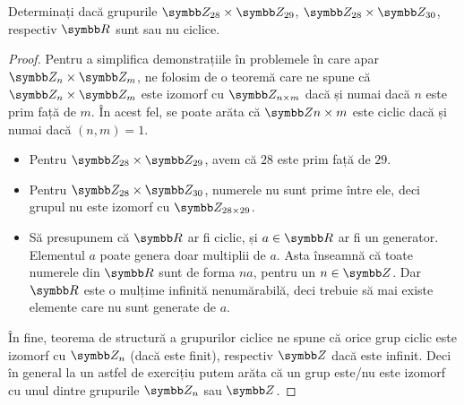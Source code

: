 \begin{exercise}
Determinați dacă grupurile \(\integersmod{28} \times \integersmod{29}\), \(\integersmod{28} \times \integersmod{30}\), respectiv \(\reals\) sunt sau nu ciclice.
\end{exercise}
\begin{proof}
Pentru a simplifica demonstrațiile în problemele în care apar \(\integersmod{n} \times \integersmod{m}\), ne folosim de o teoremă care ne spune că \(\integersmod{n} \times \integersmod{m}\) este izomorf cu \(\integersmod{n \times m}\) dacă și numai dacă \(n\) este prim față de \(m\). În acest fel, se poate arăta că \(\integers{n \times m}\) este ciclic dacă și numai dacă \((n, m) = 1\).
\begin{itemize}
    \item Pentru \(\integersmod{28} \times \integersmod{29}\), avem că \(28\) este prim față de \(29\).
    \item Pentru \(\integersmod{28} \times \integersmod{30}\), numerele nu sunt prime între ele, deci grupul nu este izomorf cu \(\integersmod{28 \times 29}\).
    \item Să presupunem că \(\reals\) ar fi ciclic, și \(a \in \reals\) ar fi un generator. Elementul \(a\) poate genera doar multiplii de \(a\). Asta înseamnă că toate numerele din \(\reals\) sunt de forma \(n a\), pentru un \(n \in \integers\). Dar \(\reals\) este o mulțime infinită nenumărabilă, deci trebuie să mai existe elemente care nu sunt generate de \(a\).
\end{itemize}

În fine, teorema de structură a grupurilor ciclice ne spune că orice grup ciclic este izomorf cu \(\integersmod{n}\) (dacă este finit), respectiv \(\integers\) dacă este infinit. Deci în general la un astfel de exercițiu putem arăta că un grup este/nu este izomorf cu unul dintre grupurile \(\integersmod{n}\) sau \(\integers\).
\end{proof}

